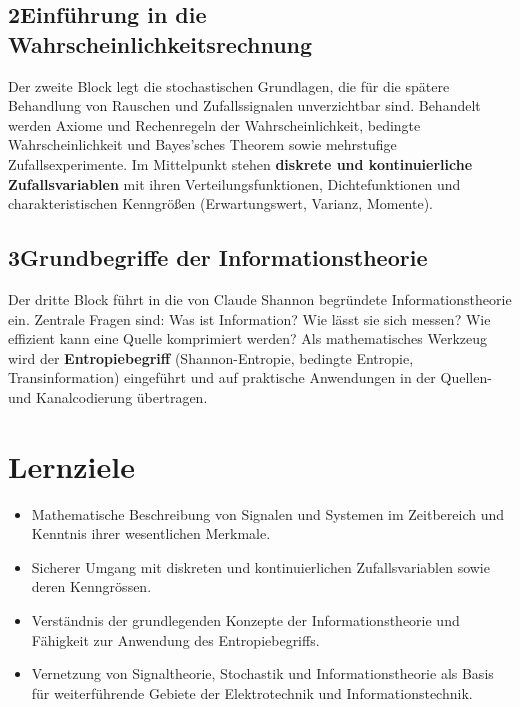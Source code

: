 \subsection*{2\quad Einführung in die Wahrscheinlichkeitsrechnung}

Der zweite Block legt die stochastischen Grundlagen, die für die spätere Behandlung
von Rauschen und Zufallssignalen unverzichtbar sind. Behandelt werden Axiome und
Rechenregeln der Wahrscheinlichkeit, bedingte Wahrscheinlichkeit und Bayes'sches
Theorem sowie mehrstufige Zufallsexperimente. Im Mittelpunkt stehen
\textbf{diskrete und kontinuierliche Zufallsvariablen} mit ihren Verteilungsfunktionen,
Dichtefunktionen und charakteristischen Kenngrößen (Erwartungswert, Varianz, Momente).

\subsection*{3\quad Grundbegriffe der Informationstheorie}

Der dritte Block führt in die von Claude Shannon begründete Informationstheorie ein.
Zentrale Fragen sind: Was ist Information? Wie lässt sie sich messen? Wie effizient
kann eine Quelle komprimiert werden? Als mathematisches Werkzeug wird der
\textbf{Entropiebegriff} (Shannon-Entropie, bedingte Entropie, Transinformation)
eingeführt und auf praktische Anwendungen in der Quellen- und Kanalcodierung übertragen.

\vspace{0.8em}

\section*{Lernziele}

\begin{itemize}
  \item Mathematische Beschreibung von Signalen und Systemen im Zeitbereich und
        Kenntnis ihrer wesentlichen Merkmale.
  \item Sicherer Umgang mit diskreten und kontinuierlichen Zufallsvariablen sowie
        deren Kenngrössen.
  \item Verständnis der grundlegenden Konzepte der Informationstheorie und Fähigkeit
        zur Anwendung des Entropiebegriffs.
  \item Vernetzung von Signaltheorie, Stochastik und Informationstheorie als Basis
        für weiterführende Gebiete der Elektrotechnik und Informationstechnik.
\end{itemize}

